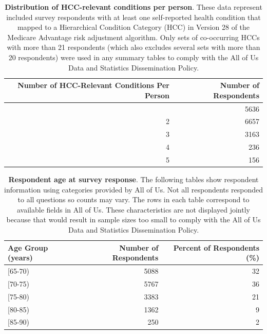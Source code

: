 \documentclass[
  12pt,
  number,
  doubleblind]{elsarticle}
\begin{document}
\newpage{}

\begin{longtable}[]{@{}rr@{}}

\caption{\label{tbl-hccspp}\textbf{Distribution of HCC-relevant
conditions per person}. These data represent included survey respondents
with at least one self-reported health condition that mapped to a
Hierarchical Condition Category (HCC) in Version 28 of the Medicare
Advantage risk adjustment algorithm. Only sets of co-occurring HCCs with
more than 21 respondents (which also excludes several sets with more
than 20 respondents) were used in any summary tables to comply with the
All of Us Data and Statistics Dissemination Policy.}

\tabularnewline

\toprule\noalign{}
Number of HCC-Relevant Conditions Per Person & Number of Respondents \\
\midrule\noalign{}
\endhead
\bottomrule\noalign{}
\endlastfoot
1 & 5636 \\
2 & 6657 \\
3 & 3163 \\
4 & 236 \\
5 & 156 \\

\end{longtable}

\newpage{}

\begin{longtable}[]{@{}lrr@{}}

\caption{\label{tbl-age}\textbf{Respondent age at survey response}. The
following tables show respondent information using categories provided
by All of Us. Not all respondents responded to all questions so counts
may vary. The rows in each table correspond to available fields in All
of Us. These characteristics are not displayed jointly because that
would result in sample sizes too small to comply with the All of Us Data
and Statistics Dissemination Policy.}

\tabularnewline

\toprule\noalign{}
Age Group (years) & Number of Respondents & Percent of Respondents
(\%) \\
\midrule\noalign{}
\endhead
\bottomrule\noalign{}
\endlastfoot
{[}65-70) & 5088 & 32 \\
{[}70-75) & 5767 & 36 \\
{[}75-80) & 3383 & 21 \\
{[}80-85) & 1362 & 9 \\
{[}85-90) & 250 & 2 \\

\end{longtable}
\end{document}
